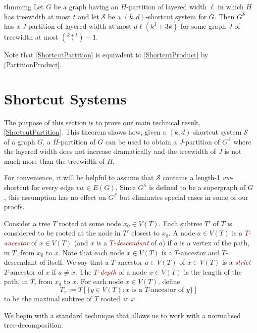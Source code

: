 \documentclass{patmorin}
\newcommand{\defin}[1]{\textcolor{Maroon}{\emph{#1}}}
\renewcommand{\SS}{\mathcal{S}}
\begin{document}
\begin{restatable}{thm}{mmg}
	\label{ShortcutPartition}
	Let $G$ be a graph having an $H$-partition of layered width $\ell$ in which $H$ has treewidth at most $t$ and let $\SS$ be a $(k,d)$-shortcut system for $G$.  Then $G^\SS$ has a $J$-partition of layered width at most $d\ell(k^3+3k)$ for some graph $J$ of treewidth at most $\binom{k+t}{t}-1$.
\end{restatable}

Note that \cref{ShortcutPartition} is equivalent to \cref{ShortcutProduct} by \cref{PartitionProduct}.



\section{Shortcut Systems}
\label{Structure}

The purpose of this section is to prove our main technical result, \cref{ShortcutPartition}. This theorem shows how, given a $(k,d)$-shortcut system $\SS$ of a graph $G$, a $H$-partition of $G$ can be used to obtain a $J$-partition of $G^{\SS}$ where the layered width  does not increase dramatically and the treewidth of $J$ is not much more than the treewidth of $H$.

For convenience, it will be helpful to assume that $\SS$ contains a length-1 $vw$-shortcut for every edge $vw\in E(G)$.  Since $G^\SS$ is defined to be a supergraph of $G$, this assumption has no effect on $G^{\SS}$ but eliminates special cases in some of our proofs.

Consider a tree $T$ rooted at some node $x_0\in V(T)$. Each subtree $T'$ of $T$ is considered to be rooted at the node in $T'$ closest to $x_0$. A node $a\in V(T)$ is a \defin{$T$-ancestor} of $x\in V(T)$ (and $x$ is a \defin{$T$-descendant} of $a$) if $a$ is a vertex of the path, in $T$, from $x_0$ to $x$.  Note that each node $x\in V(T)$ is a $T$-ancestor and $T$-descendant of itself.  We say that a $T$-ancestor $a\in V(T)$ of $x\in V(T)$ is a \defin{strict} $T$-ancestor of $x$ if $a\neq x$.
The \defin{$T$-depth} of a node $x\in V(T)$ is the length of the path, in $T$, from $x_0$ to $x$.  For each node $x\in V(T)$, define
\[T_x := T[\{y\in V(T):\mbox{$x$ is a $T$-ancestor of $y$}\}] \]
to be the maximal subtree of $T$ rooted at $x$.

We begin with a standard technique that allows us to work with a normalised tree-decomposition:
\end{document}
